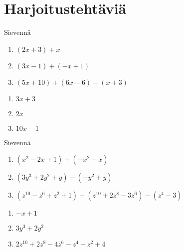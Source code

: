 \section{Harjoitustehtäviä}

\begin{tehtava}
    Sievennä
    \begin{enumerate}
        \item $(2x + 3) + x $
        \item $(3x - 1) + (-x + 1)$
        \item $(5x + 10) + (6x - 6) - (x + 3)$
    \end{enumerate}
    \begin{vastaus}
        \begin{enumerate}
            \item $3x + 3$
            \item $2x$
            \item $10x - 1$
        \end{enumerate}
    \end{vastaus}
\end{tehtava}

\begin{tehtava}
    Sievennä
    \begin{enumerate}
        \item $(x^2 - 2x + 1) + (-x^2 + x) $
        \item $(3y^3 + 2y^2  + y) - (-y^2 + y)$
        \item $(z^{10} - z^6 + z^2 + 1) + (z^{10} + 2z^8 - 3z^6) - (z^4 - 3)$
    \end{enumerate}
    \begin{vastaus}
        \begin{enumerate}
            \item $-x + 1$
            \item $3y^3 + 2y^2$
            \item $2z^{10} + 2z^8 - 4z^6 - z^4 + z^2 + 4$
        \end{enumerate}
    \end{vastaus}
\end{tehtava}

